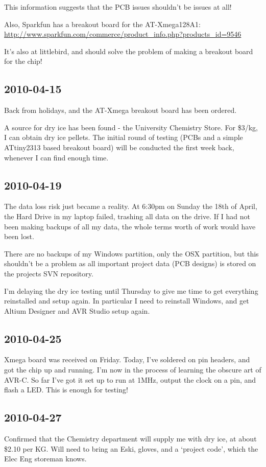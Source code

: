 \documentclass[a4paper,10pt]{article}
\begin{document}
This information suggests that the PCB issues shouldn't be issues at all!

Also, Sparkfun has a breakout board for the AT-Xmega128A1:
\url{http://www.sparkfun.com/commerce/product_info.php?products_id=9546}

It's also at littlebird, and should solve the problem of making a breakout board for the chip!

\subsection{2010-04-15}
Back from holidays, and the AT-Xmega breakout board has been ordered. 

A source for dry ice has been found - the University Chemistry Store. For \$3/kg, I can obtain dry ice pellets. The initial round of testing (PCBs and a simple ATtiny2313 based breakout board) will be conducted the first week back, whenever I can find enough time.

\subsection{2010-04-19}
The data loss risk just became a reality. At 6:30pm on Sunday the 18th of April, the Hard Drive in my laptop failed, trashing all data on the drive. If I had not been making backups of all my data, the whole terms worth of work would have been lost.

There are no backups of my Windows partition, only the OSX partition, but this shouldn't be a problem as all important project data (PCB designs) is stored on the projects SVN repository.

I'm delaying the dry ice testing until Thursday to give me time to get everything reinstalled and setup again. In particular I need to reinstall Windows, and get Altium Designer and AVR Studio setup again.

\subsection{2010-04-25}
Xmega board was received on Friday. Today, I've soldered on pin headers, and got the chip up and running. I'm now in the process of learning the obscure art of AVR-C. So far I've got it set up to run at 1MHz, output the clock on a pin, and flash a LED. This is enough for testing!

\subsection{2010-04-27}
Confirmed that the Chemistry department will supply me with dry ice, at about \$2.10 per KG. Will need to bring an Eski, gloves, and a `project code', which the Elec Eng storeman knows.
\end{document}
